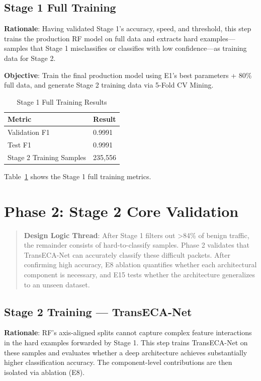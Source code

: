 \documentclass[sigconf]{acmart}
\begin{document}
\subsection{Stage 1 Full Training}
\textbf{Rationale}: Having validated Stage 1's accuracy, speed, and threshold, this step trains the production RF model on full data and extracts hard examples---samples that Stage 1 misclassifies or classifies with low confidence---as training data for Stage 2.

\textbf{Objective}: Train the final production model using E1's best parameters + 80\% full data, and generate Stage 2 training data via 5-Fold CV Mining.

\begin{table}[!h]
\caption{Stage 1 Full Training Results}
\label{tab:s1_full}
\begin{tabular}{ll}
\toprule
\textbf{Metric} & \textbf{Result} \\
\midrule
Validation F1 & 0.9991 \\
Test F1 & 0.9991 \\
Stage 2 Training Samples & 235,556 \\
\bottomrule
\end{tabular}
\end{table}

\noindent Table~\ref{tab:s1_full} shows the Stage 1 full training metrics.

\section{Phase 2: Stage 2 Core Validation}
\begin{quote}
\textbf{Design Logic Thread}: After Stage 1 filters out >84\% of benign traffic, the remainder consists of hard-to-classify samples. Phase 2 validates that TransECA-Net can accurately classify these difficult packets. After confirming high accuracy, E8 ablation quantifies whether each architectural component is necessary, and E15 tests whether the architecture generalizes to an unseen dataset.
\end{quote}

\subsection{Stage 2 Training --- TransECA-Net}
\textbf{Rationale}: RF's axis-aligned splits cannot capture complex feature interactions in the hard examples forwarded by Stage 1. This step trains TransECA-Net on these samples and evaluates whether a deep architecture achieves substantially higher classification accuracy. The component-level contributions are then isolated via ablation (E8).
\end{document}
